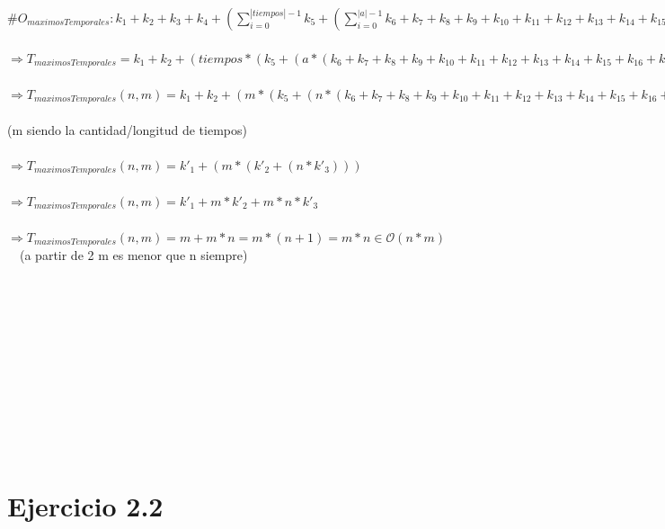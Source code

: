 \documentclass{article}
\begin{document}
$\#O_{maximosTemporales}:  k_{1} + k_{2} +  k_{3} + k_{4} + (\sum_{i=0}^{|tiempos|-1} k_{5} + (\sum_{i=0}^{|a|-1} k_{6} + k_{7} + k_{8} + k_{9} + k_{10} + k_{11} + k_{12} + k_{13} + k_{14} + k_{15} + k_{16} + k_{17}))  $
\\ \\
$\Rightarrow  T_{maximosTemporales}=  k_{1} + k_{2} + (tiempos*(k_{5} + (a *(k_{6} + k_{7} + k_{8} + k_{9} + k_{10} + k_{11} + k_{12} + k_{13} + k_{14} + k_{15} + k_{16} + k_{17}))))$
\\ \\
$\Rightarrow  T_{maximosTemporales}(n,m)=  k_{1} + k_{2} + (m*(k_{5} + (n *(k_{6} + k_{7} + k_{8} + k_{9} + k_{10} + k_{11} + k_{12} + k_{13} + k_{14} + k_{15} + k_{16} + k_{17}))))$ 
\\ \\
(m siendo la cantidad/longitud de tiempos)
\\ \\
$\Rightarrow  T_{maximosTemporales}(n,m)=  k'_{1} + (m * (k'_{2} + (n * k'_{3})))$
\\ \\
$\Rightarrow  T_{maximosTemporales}(n,m)=  k'_{1} + m * k'_{2} + m * n * k'_{3}$
\\ \\
$\Rightarrow  T_{maximosTemporales}(n,m)=  m  + m * n = m*(n+1) = m*n  \in \mathcal{O}(n*m)$  \ \ (a partir de 2 m es menor que n siempre) 

\ \\ \ \\
\ \\ \ \\
\ \\ \ \\
\ \\ \ \\
\ \\ \ \\

\section*{Ejercicio 2.2}
\end{document}
